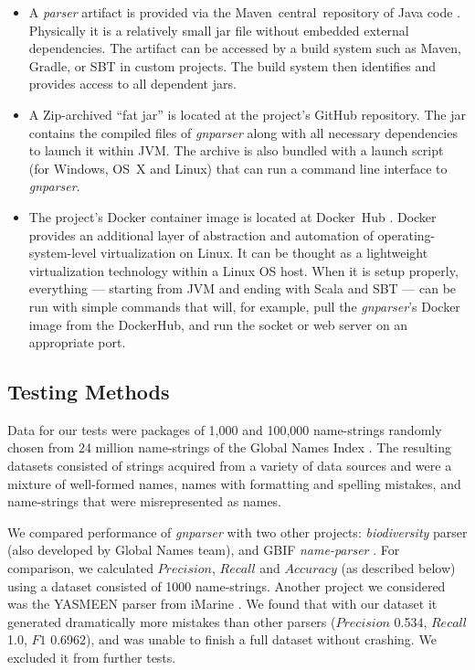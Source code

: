 \documentclass{bmcart}
\begin{document}
\begin{itemize}
  \item A \textit{parser} artifact is provided via the Maven~central~repository
    of Java code \cite{maven-globalnames}. Physically it is a relatively small
    jar file without embedded external dependencies. The artifact can be
    accessed by a build system such as Maven, Gradle, or SBT in custom
    projects. The build system then identifies and provides access to all
    dependent jars.

  \item A Zip-archived ``fat jar'' is located at the project's GitHub
    repository. The jar contains the compiled files of \textit{gnparser} along
    with all necessary dependencies to launch it within JVM\@. The archive is
    also bundled with a launch script (for Windows, OS~X and Linux) that can
    run a command line interface to \textit{gnparser}.

  \item The project's Docker container image is located at Docker~Hub
    \cite{gnparser-docker}. Docker provides an additional layer of abstraction
    and automation of operating-system-level virtualization on Linux. It can be
    thought as a lightweight virtualization technology within a Linux OS host.
    When it is setup properly, everything --- starting from JVM and ending with
    Scala and SBT --- can be run with simple commands that will, for example,
    pull the \textit{gnparser}'s Docker image from the DockerHub, and run the
    socket or web server on an appropriate port.

\end{itemize}

\subsection*{Testing Methods}

Data for our tests were packages of 1,000 and 100,000 name-strings randomly
chosen from 24 million name-strings of the Global Names Index \cite{gn:index}.
The resulting datasets consisted of strings acquired from a variety of data
sources and were a mixture of well-formed names, names with formatting and
spelling mistakes, and name-strings that were misrepresented as names.

We compared performance of \textit{gnparser} with two other projects:
\textit{biodiversity} parser \cite{Boyle2013, biodiversity} (also developed by
Global Names team), and GBIF \textit{name-parser} \cite{gbifNameParser}. For
comparison, we calculated $Precision$, $Recall$ and $Accuracy$ (as described
below) using a dataset consisted of 1000 name-strings. Another project we
considered was the YASMEEN parser from iMarine \cite{VandenBerghe2015}. We
found that with our dataset it generated dramatically more mistakes than other
parsers ($Precision$ 0.534, $Recall$ 1.0, $F1$ 0.6962), and was unable to
finish a full dataset without crashing. We excluded it from further tests.
\end{document}
